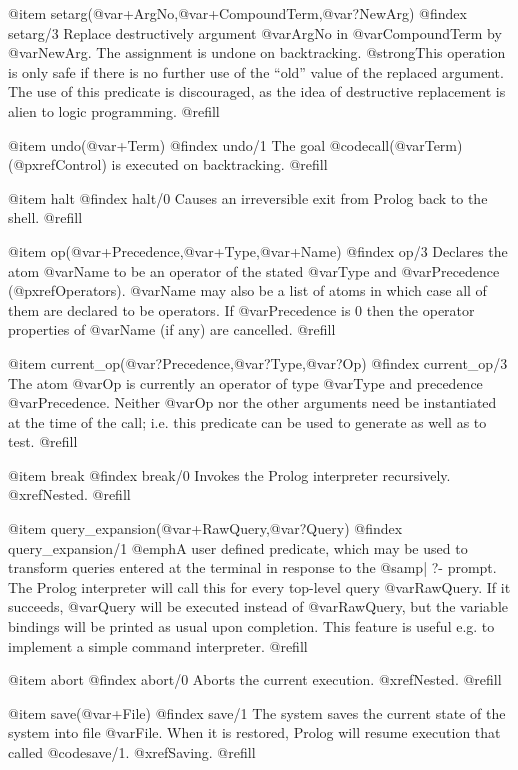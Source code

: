 @item setarg(@var{+ArgNo},@var{+CompoundTerm},@var{?NewArg})
@findex setarg/3
Replace destructively argument @var{ArgNo} in @var{CompoundTerm} by
@var{NewArg}.  The assignment is undone on backtracking.  @strong{This
operation is only safe if there is no further use of the ``old'' value
of the replaced argument}.  The use of this predicate is discouraged, as
the idea of destructive replacement is alien to logic programming.
@refill

@item undo(@var{+Term})
@findex undo/1
The goal @code{call(@var{Term})} (@pxref{Control}) is executed on
backtracking. @refill

@item halt
@findex halt/0
Causes an irreversible exit from Prolog back to the shell. @refill

@item op(@var{+Precedence},@var{+Type},@var{+Name})
@findex op/3
Declares the atom @var{Name} to be an operator of the stated @var{Type} and
@var{Precedence} (@pxref{Operators}).  @var{Name} may also be a list of
atoms in which case all of them are declared to be operators.  If
@var{Precedence} is 0 then the operator properties of @var{Name} (if any)
are cancelled. @refill

@item current_op(@var{?Precedence},@var{?Type},@var{?Op})
@findex current_op/3
The atom @var{Op} is currently an operator of type @var{Type} and
precedence @var{Precedence}.  Neither @var{Op} nor the other arguments need
be instantiated at the time of the call; i.e. this predicate can be used
to generate as well as to test. @refill

@item break
@findex break/0
Invokes the Prolog interpreter recursively.  @xref{Nested}.  @refill

@item query_expansion(@var{+RawQuery},@var{?Query})
@findex query_expansion/1
@emph{A user defined predicate}, which may be used to transform queries
entered at the terminal in response to the @samp{| ?-} prompt.  The
Prolog interpreter will call this for every top-level query
@var{RawQuery}.  If it succeeds, @var{Query} will be executed instead of
@var{RawQuery}, but the variable bindings will be printed as usual upon
completion.  This feature is useful e.g. to implement a simple command
interpreter. @refill

@item abort
@findex abort/0
Aborts the current execution.  @xref{Nested}. @refill

@item save(@var{+File})
@findex save/1
The system saves the current state of the system into file @var{File}.
When it is restored, Prolog will resume execution that called @code{save/1}.
@xref{Saving}. @refill

